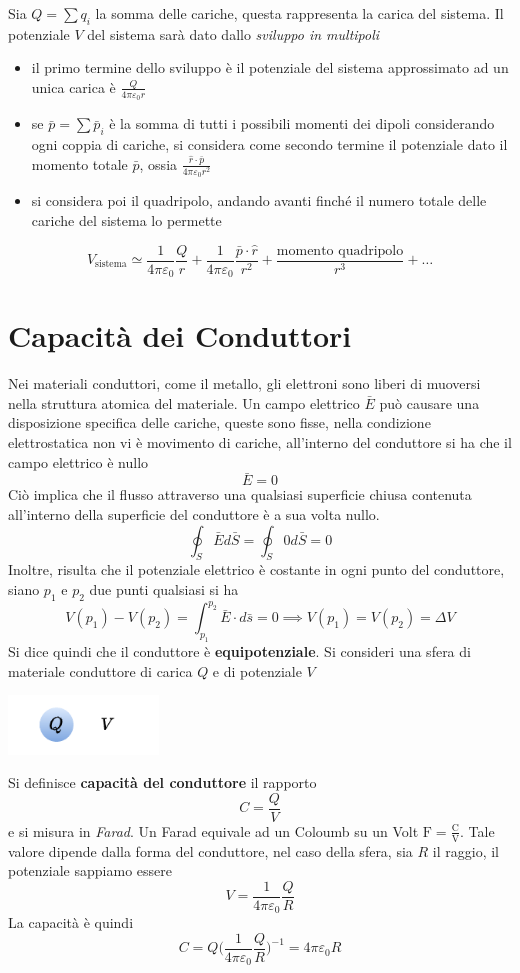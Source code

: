 \documentclass[10pt, letterpaper]{report}
\begin{document}
Sia $Q=\sum q_i$ la somma delle cariche, questa rappresenta la carica del sistema. Il potenziale $V$ del sistema sarà dato dallo \textit{sviluppo in multipoli}\begin{itemize}
    \item il primo termine dello sviluppo è il potenziale del sistema approssimato ad un unica carica è $\frac{Q}{4\pi\varepsilon_0 r}$
    \item se $\bar p=\sum \bar p_i$ è la somma di tutti i possibili momenti dei dipoli considerando ogni coppia di cariche, si considera come secondo termine il potenziale dato il momento totale $\bar p$, ossia $\frac{\hat r \cdot \bar p}{4\pi\varepsilon_0 r^2}$
    \item si considera poi il quadripolo, andando avanti finché il numero totale delle cariche del sistema lo permette 
\end{itemize}
$$ V_{\text{sistema}}\simeq \frac{1}{4\pi\varepsilon_0}\frac{Q}{r}+ \frac{1}{4\pi\varepsilon_0}\frac{\bar p\cdot  \hat r}{r^2}+\frac{\text{momento quadripolo}}{r^3}+\dots$$
\flowerLine 
\section{Capacità dei Conduttori}
Nei materiali conduttori, come il metallo, gli elettroni sono liberi di muoversi nella struttura atomica del materiale. Un campo elettrico $\bar E$ può causare una disposizione specifica delle cariche, queste sono fisse, nella condizione elettrostatica non vi è movimento di cariche, all'interno del conduttore si ha che il campo elettrico è nullo 
$$\bar E = 0$$
Ciò implica che il flusso attraverso una qualsiasi superficie chiusa contenuta all'interno della superficie del conduttore è a sua volta nullo. 
$$ \oint_S \bar E d\bar S =  \oint_S 0 d\bar S = 0$$ 
Inoltre, risulta che il potenziale elettrico è costante in ogni punto del conduttore, siano $p_1$ e $p_2$ due punti qualsiasi si ha 
$$ V(p_1)-V(p_2)=\int_{p_1}^{p_2}\bar E \cdot d\bar s=0 \implies V(p_1)=V(p_2)=\Delta V$$
Si dice quindi che il conduttore è \textbf{equipotenziale}. Si consideri una sfera di materiale conduttore di carica $Q$ e di potenziale $V$
\begin{center}
    \includegraphics[width=0.3\textwidth]{images/sferaPot.pdf}
\end{center} 
Si definisce \textbf{capacità del conduttore} il rapporto 
$$ C=\frac{Q}{V}$$ 
e si misura in \textit{Farad}. Un Farad equivale ad un Coloumb su un Volt $\text{F}=\frac{\text{C}}{\text{V}}$.
Tale valore dipende dalla forma del conduttore, nel caso della sfera, sia $R$ il raggio, il potenziale sappiamo essere 
$$V=\frac{1}{4\pi\varepsilon_0}\frac{Q}{R}$$
La capacità è quindi 
$$ C=Q\Big(\frac{1}{4\pi\varepsilon_0}\frac{Q}{R} \Big)^{-1}=4\pi\varepsilon_0 R$$
\end{document}

